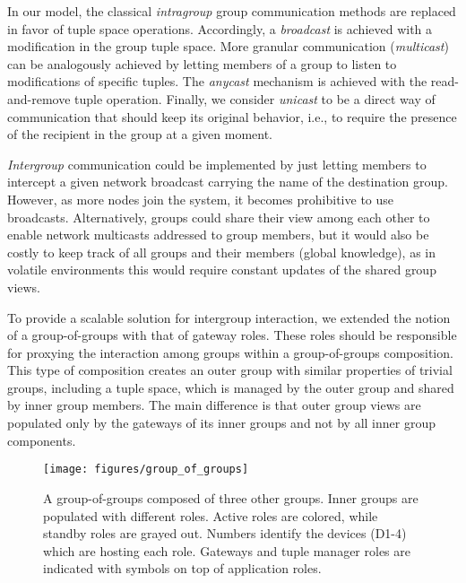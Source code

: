 In our model, the classical \textit{intragroup} group communication methods are replaced in favor of tuple space operations. Accordingly, a \textit{broadcast} is achieved with a modification in the group tuple space. More granular communication (\textit{multicast}) can be analogously achieved by letting members of a group to listen to modifications of specific tuples. The \textit{anycast} mechanism is achieved with the read-and-remove tuple operation. Finally, we consider \textit{unicast} to be a direct way of communication that should keep its original behavior, i.e., to require the presence of the recipient in the group at a given moment. %



\textit{Intergroup} communication could be implemented by just letting members to intercept a given network broadcast carrying the name of the destination group. However, as more nodes join the system, it becomes prohibitive to use broadcasts. Alternatively, groups could share their view among each other to enable network multicasts addressed to group members, but it would also be costly to keep track of all groups and their members (global knowledge), as in volatile environments this would require constant updates of the shared group views. 

To provide a scalable solution for intergroup interaction, we extended the notion of a group-of-groups with that of gateway roles. These roles should be responsible for proxying the interaction among groups within a group-of-groups composition. This type of composition creates an outer group with similar properties of trivial groups, including a tuple space, which is managed by the outer group and shared by inner group members. The main difference is that outer group views are populated only by the gateways of its inner groups and not by all inner group components. %

\begin{figure}[ht!]
	\centering
	\texttt{[image: figures/group\_of\_groups]}
	\caption{A group-of-groups composed of three other groups. Inner groups are populated with different roles. Active roles are colored, while standby roles are grayed out. Numbers identify the devices (D1-4) which are hosting each role. Gateways and tuple manager roles are indicated with symbols on top of application roles.}
	\label{fig:group_of_groups}
\end{figure}

